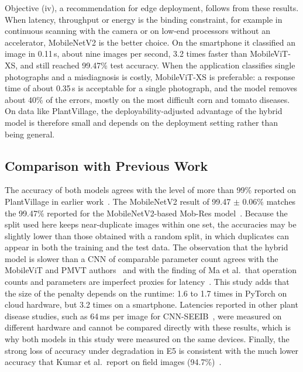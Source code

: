 \documentclass[conference]{IEEEtran}
\begin{document}
Objective (iv), a recommendation for edge deployment, follows from these results. When latency, throughput or energy is the binding constraint, for example in continuous scanning with the camera or on low-end processors without an accelerator, MobileNetV2 is the better choice. On the smartphone it classified an image in 0.11\,s, about nine images per second, 3.2 times faster than MobileViT-XS, and still reached 99.47\% test accuracy. When the application classifies single photographs and a misdiagnosis is costly, MobileViT-XS is preferable: a response time of about 0.35\,s is acceptable for a single photograph, and the model removes about 40\% of the errors, mostly on the most difficult corn and tomato diseases. On data like PlantVillage, the deployability-adjusted advantage of the hybrid model is therefore small and depends on the deployment setting rather than being general.

\subsection{Comparison with Previous Work}

The accuracy of both models agrees with the level of more than 99\% reported on PlantVillage in earlier work~\cite{mohanty2016plant,karthikeyan2025cnnseeib,pal2025mobres}. The MobileNetV2 result of 99.47 $\pm$ 0.06\% matches the 99.47\% reported for the MobileNetV2-based Mob-Res model~\cite{pal2025mobres}. Because the split used here keeps near-duplicate images within one set, the accuracies may be slightly lower than those obtained with a random split, in which duplicates can appear in both the training and the test data. The observation that the hybrid model is slower than a CNN of comparable parameter count agrees with the MobileViT and PMVT authors~\cite{mehta2022mobilevit,li2023pmvt} and with the finding of Ma et al.\ that operation counts and parameters are imperfect proxies for latency~\cite{ma2018shufflenetv2}. This study adds that the size of the penalty depends on the runtime: 1.6 to 1.7 times in PyTorch on cloud hardware, but 3.2 times on a smartphone. Latencies reported in other plant disease studies, such as 64\,ms per image for CNN-SEEIB~\cite{karthikeyan2025cnnseeib}, were measured on different hardware and cannot be compared directly with these results, which is why both models in this study were measured on the same devices. Finally, the strong loss of accuracy under degradation in E5 is consistent with the much lower accuracy that Kumar et al.\ report on field images (94.7\%)~\cite{kumar2025mobilefriendly}.
\end{document}
